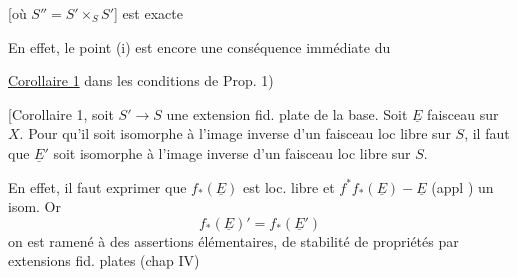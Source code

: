 [où $S''=S'\times_S S'$] est exacte 

 En effet, le point (i) est encore une conséquence immédiate du

\uline{Corollaire 1} dans les conditions de Prop. 1)

[Corollaire 1, soit $S'\to S$ une extension fid. plate  de la base. Soit $\underline E$ faisceau  sur $X$. Pour qu'il soit isomorphe à l'image inverse d'un faisceau loc libre  sur $S$, il faut que $\underline E'$ soit isomorphe à l'image inverse d'un faisceau loc libre sur $S$.

En effet, il faut exprimer que $f_*(\underline E)$ est loc. libre et \deleted{$\unsure{\xi}$} $f^*f_*(\underline E)-\underline E$ (appl ) un isom. Or
\[
f_*(\underline E)'=f_*(\underline E')
\]
on est ramené à des assertions élémentaires, de stabilité de propriétés par extensions fid. plates (chap IV)

